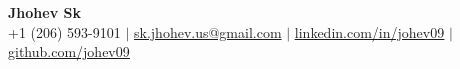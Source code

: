     \textbf{\Huge Jhohev Sk} \\
    \vspace{10pt}
    \small{
        +1 (206) 593-9101 $|$
        \href{mailto:sk.jhohev.us@gmail.com}{sk.jhohev.us@gmail.com} $|$
        \href{https://linkedin.com/in/johev09}{\underline{linkedin.com/in/johev09}} $|$
        \href{https://github.com/johev09}{\underline{github.com/johev09}}
    }
